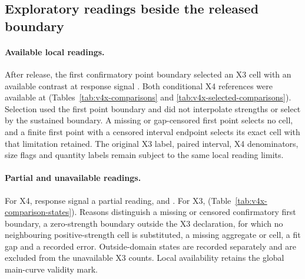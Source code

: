 \subsection*{Exploratory readings beside the released boundary}

\paragraph{Available local readings.}
After release, the first confirmatory point boundary selected an X3 cell with an available contrast at  response signal . Both conditional X4 references were available at   (Tables~\ref{tab:v4x-comparisons} and \ref{tab:v4x-selected-comparisons}).
Selection used the first point boundary and did not interpolate strengths or select by the sustained boundary. A missing or gap-censored first point selects no cell, and a finite first point with a censored interval endpoint selects its exact cell with that limitation retained.
The original X3 label, paired interval, X4 denominators, size flags and quantity labels remain subject to the same local reading limits.

\paragraph{Partial and unavailable readings.}
For X4,  response signal  a partial reading, and  . For X3,   (Table~\ref{tab:v4x-comparison-states}).
Reasons distinguish a missing or censored confirmatory first boundary, a zero-strength boundary outside the X3 declaration, for which no neighbouring positive-strength cell is substituted, a missing aggregate or cell, a fit gap and a recorded error. Outside-domain states are recorded separately and are excluded from the unavailable X3 counts.
Local availability retains the global main-curve validity mark.

